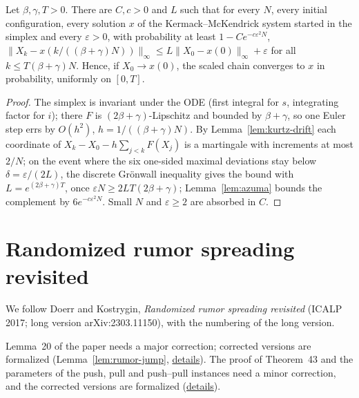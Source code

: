 \begin{theorem}\label{thm:kurtz}
\leanok{}
Let $\beta,\gamma,T>0$. There are $C,c>0$ and $L$ such that for every $N$, every initial
configuration, every solution $x$ of the Kermack--McKendrick system started in the simplex and
every $\varepsilon>0$, with probability at least $1-Ce^{-c\varepsilon^2N}$,
$\|X_k-x(k/((\beta+\gamma)N))\|_\infty\le L\|X_0-x(0)\|_\infty+\varepsilon$ for all
$k\le T(\beta+\gamma)N$. Hence, if $X_0\to x(0)$, the scaled chain converges to $x$ in probability,
uniformly on $[0,T]$.
\end{theorem}
\begin{proof}\leanok
The simplex is invariant under the ODE (first integral for $s$, integrating factor for $i$); there
$F$ is $(2\beta+\gamma)$-Lipschitz and bounded by $\beta+\gamma$, so one Euler step errs by
$O(h^2)$, $h=1/((\beta+\gamma)N)$. By Lemma~\ref{lem:kurtz-drift} each coordinate of
$X_k-X_0-h\sum_{j<k}F(X_j)$ is a martingale with increments at most $2/N$; on the event where the
six one-sided maximal deviations stay below $\delta=\varepsilon/(2L)$, the discrete Gr\"onwall
inequality gives the bound with $L=e^{(2\beta+\gamma)T}$, once $\varepsilon N\ge2LT(2\beta+\gamma)$;
Lemma~\ref{lem:azuma} bounds the complement by $6e^{-c\varepsilon^2N}$. Small $N$ and
$\varepsilon\ge2$ are absorbed in $C$.
\end{proof}

\section{Randomized rumor spreading revisited}\label{sec:doerr-kostrygin}
We follow Doerr and Kostrygin, \emph{Randomized rumor spreading revisited} (ICALP 2017; long
version arXiv:2303.11150), with the numbering of the long version.

Lemma~20 of the paper needs a major correction; corrected versions are formalized
(Lemma~\ref{lem:rumor-jump},
\href{https://github.com/formal-dynamics/leanamics/blob/main/epidemics/FORMALIZATION_DIFFERENCES.md#lemma-20-of-the-paper-needs-a-major-correction}{details}).
The proof of Theorem~43 and the parameters of the push, pull and push--pull instances need a
minor correction, and the corrected versions are formalized
(\href{https://github.com/formal-dynamics/leanamics/blob/main/epidemics/FORMALIZATION_DIFFERENCES.md#theorem-43-and-the-push-pull-and-pushpull-protocols}{details}).

